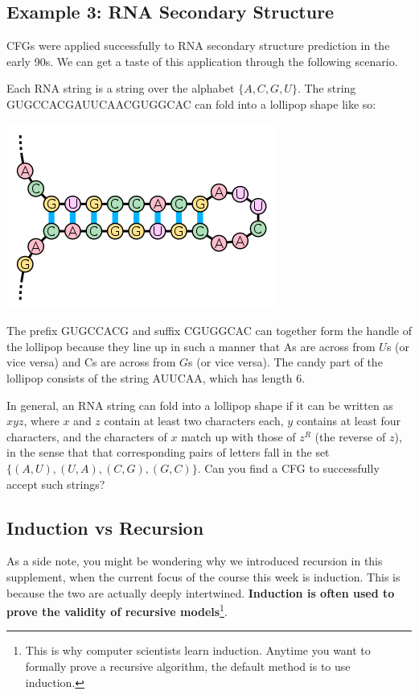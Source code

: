 \documentclass{article}
\begin{document}
\subsection*{Example 3: RNA Secondary Structure}
        CFGs were applied successfully to RNA secondary structure prediction in the early 90s. We can get a taste of this application through the following scenario. 
        
        \vspace{3mm}Each RNA string is a string over the alphabet $\{A, C, G, U\}$. The string GUGCCACGAUUCAACGUGGCAC can fold into a lollipop shape like so:
        \begin{center}
            \includegraphics[scale = 0.4]{images/stem-loop.png}
        \end{center}
        The prefix GUGCCACG and suffix CGUGGCAC can together form the handle of the lollipop because they line up in such a manner that As are across from $U$s (or vice versa) and Cs are across from $G$s (or vice versa). The candy part of the lollipop consists of the string AUUCAA, which has length 6.

        \vspace{3mm}In general, an RNA string can fold into a lollipop shape if it can be written as $xyz$, where $x$ and $z$ contain at least two characters each, $y$ contains at least four characters, and the characters of $x$ match up with those of $z^{R}$ (the reverse of $z$), in the sense that that corresponding pairs of letters fall in the set $\{(A, U), (U, A), (C, G), (G, C)\}$. Can you find a CFG to successfully accept such strings?

\subsection*{Induction vs Recursion}
    As a side note, you might be wondering why we introduced recursion in this supplement, when the current focus of the course this week is induction. This is because the two are actually deeply intertwined. \textbf{Induction is often used to prove the validity of recursive models}\footnote{This is why computer scientists learn induction. Anytime you want to formally prove a recursive algorithm, the default method is to use induction.}.
\end{document}
